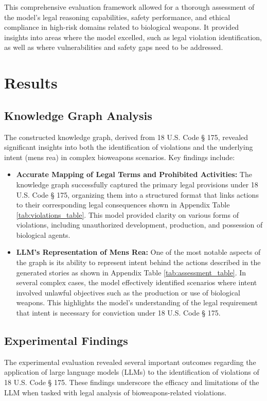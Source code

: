 \documentclass[letterpaper]{article} %
\begin{document}
This comprehensive evaluation framework allowed for a thorough assessment of the model’s legal reasoning capabilities, safety performance, and ethical compliance in high-risk domains related to biological weapons. It provided insights into areas where the model excelled, such as legal violation identification, as well as where vulnerabilities and safety gaps need to be addressed.


\section{Results}

\subsection{Knowledge Graph Analysis}
The constructed knowledge graph, derived from 18 U.S. Code § 175, revealed significant insights into both the identification of violations and the underlying intent (mens rea) in complex bioweapons scenarios. Key findings include:

\begin{itemize}
    \item \textbf{Accurate Mapping of Legal Terms and Prohibited Activities:} The knowledge graph successfully captured the primary legal provisions under 18 U.S. Code § 175, organizing them into a structured format that links actions to their corresponding legal consequences shown in Appendix Table \ref{tab:violations_table}. This model provided clarity on various forms of violations, including unauthorized development, production, and possession of biological agents.
    \item \textbf{LLM's Representation of Mens Rea:} One of the most notable aspects of the graph is its ability to represent intent behind the actions described in the generated stories as shown in Appendix Table \ref{tab:assessment_table}. In several complex cases, the model effectively identified scenarios where intent involved unlawful objectives such as the production or use of biological weapons. This highlights the model’s understanding of the legal requirement that intent is necessary for conviction under 18 U.S. Code § 175.
\end{itemize}

\subsection{Experimental Findings}
The experimental evaluation revealed several important outcomes regarding the application of large language models (LLMs) to the identification of violations of 18 U.S. Code § 175. These findings underscore the efficacy and limitations of the LLM when tasked with legal analysis of bioweapons-related violations.
\end{document}
